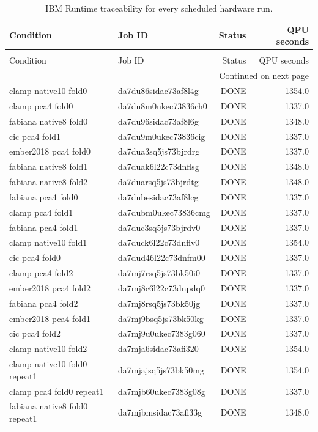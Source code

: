 \begin{longtable}{llrr}
\caption{IBM Runtime traceability for every scheduled hardware run.} \label{tab:hardware-jobs} \\
\toprule
Condition & Job ID & Status & QPU seconds \\
\midrule
\endfirsthead
\caption[]{IBM Runtime traceability for every scheduled hardware run.} \\
\toprule
Condition & Job ID & Status & QPU seconds \\
\midrule
\endhead
\midrule
\multicolumn{4}{r}{Continued on next page} \\
\midrule
\endfoot
\bottomrule
\endlastfoot
clamp native10  fold0 & da7du86sidac73af8l4g & DONE & 1354.0 \\
clamp pca4  fold0 & da7du8m0ukec73836ch0 & DONE & 1337.0 \\
fabiana native8  fold0 & da7du96sidac73af8l6g & DONE & 1348.0 \\
cic pca4  fold1 & da7du9m0ukec73836cig & DONE & 1337.0 \\
ember2018 pca4  fold0 & da7dua3sq5js73bjrdrg & DONE & 1337.0 \\
fabiana native8  fold1 & da7duak6l22c73dnflsg & DONE & 1348.0 \\
fabiana native8  fold2 & da7duarsq5js73bjrdtg & DONE & 1348.0 \\
fabiana pca4  fold0 & da7dubesidac73af8lcg & DONE & 1337.0 \\
clamp pca4  fold1 & da7dubm0ukec73836cmg & DONE & 1337.0 \\
fabiana pca4  fold1 & da7duc3sq5js73bjrdv0 & DONE & 1337.0 \\
clamp native10  fold1 & da7duck6l22c73dnflv0 & DONE & 1354.0 \\
cic pca4  fold0 & da7dud46l22c73dnfm00 & DONE & 1337.0 \\
clamp pca4  fold2 & da7mj7rsq5js73bk50i0 & DONE & 1337.0 \\
ember2018 pca4  fold2 & da7mj8c6l22c73dnpdq0 & DONE & 1337.0 \\
fabiana pca4  fold2 & da7mj8rsq5js73bk50jg & DONE & 1337.0 \\
ember2018 pca4  fold1 & da7mj9bsq5js73bk50kg & DONE & 1337.0 \\
cic pca4  fold2 & da7mj9u0ukec7383g060 & DONE & 1337.0 \\
clamp native10  fold2 & da7mja6sidac73afi320 & DONE & 1354.0 \\
clamp native10  fold0  repeat1 & da7mjajsq5js73bk50mg & DONE & 1354.0 \\
clamp pca4  fold0  repeat1 & da7mjb60ukec7383g08g & DONE & 1337.0 \\
fabiana native8  fold0  repeat1 & da7mjbmsidac73afi33g & DONE & 1348.0 \\
\end{longtable}
